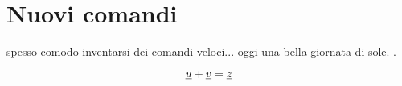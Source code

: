 \section{Nuovi comandi}

\EEE spesso comodo inventarsi dei comandi veloci... oggi \eee una bella giornata di sole. \eee.

\[
\underline{u} + \underline{v} = \underline{z}
\]